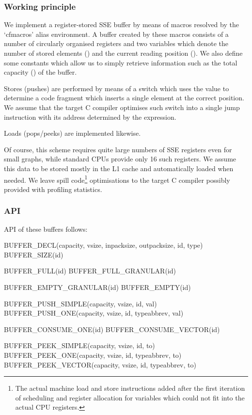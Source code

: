 \subsubsection{Working principle}

We implement a register-stored SSE buffer by means of macros resolved by the `cfmacros' alias environment. A buffer created by these macros consists of a number of circularly organised registers and two variables which denote the number of stored elements () and the current reading position (). We also define some constants which allow us to simply retrieve information such as the total capacity () of the buffer.

Stores (pushes) are performed by means of a switch which uses the value  to determine a code fragment which inserts a single element at the correct position. We assume that the target C compiler optimises such switch into a single jump instruction with its address determined by the expression.

Loads (pops/peeks) are implemented likewise. 

Of course, this scheme requires quite large numbers of SSE registers even for small graphs, while standard CPUs provide only 16 such registers. We assume this data to be stored mostly in the L1 cache and automatically loaded when needed. We leave spill code\footnote{The actual machine load and store instructions added after the first iteration of scheduling and register allocation for variables which could not fit into the actual CPU registers.} optimisations to the target C compiler possibly provided with profiling statistics.

\subsubsection{API}

API of these buffers follows:

\begin{code}
BUFFER_DECL(capacity, vsize, inpacksize, outpacksize, id, type)
BUFFER_SIZE(id)

BUFFER_FULL(id)
BUFFER_FULL_GRANULAR(id)

BUFFER_EMPTY_GRANULAR(id)
BUFFER_EMPTY(id)

BUFFER_PUSH_SIMPLE(capacity, vsize, id, val)
BUFFER_PUSH_ONE(capacity, vsize, id, typeabbrev, val)

BUFFER_CONSUME_ONE(id)
BUFFER_CONSUME_VECTOR(id)

BUFFER_PEEK_SIMPLE(capacity, vsize, id, to)
BUFFER_PEEK_ONE(capacity, vsize, id, typeabbrev, to)
BUFFER_PEEK_VECTOR(capacity, vsize, id, typeabbrev, to)
\end{code}

